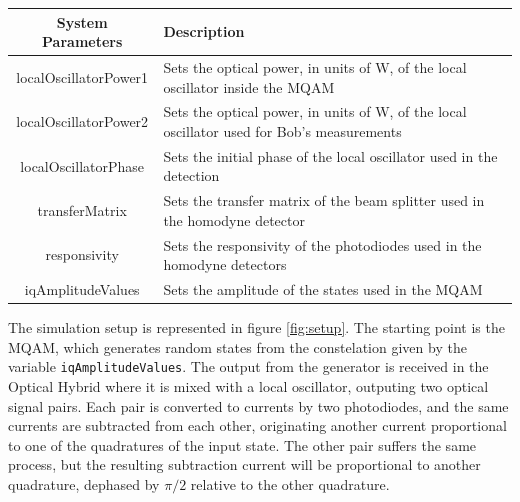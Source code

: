 \begin{table}[H]
\centering
\begin{tabulary}{1.0\textwidth}{|c|p{11cm}|}
\hline
\textbf{System Parameters} & \textbf{Description}\\
\hline
localOscillatorPower1	& Sets the optical power, in units of W, of the local oscillator inside the MQAM\\
\hline
localOscillatorPower2	& Sets the optical power, in units of W, of the local oscillator used for Bob's measurements\\
\hline
localOscillatorPhase	& Sets the initial phase of the local oscillator used in the detection\\
\hline
transferMatrix			& Sets the transfer matrix of the beam splitter used in the homodyne detector\\
\hline
responsivity			& Sets the responsivity of the photodiodes used in the homodyne detectors\\
\hline
iqAmplitudeValues		& Sets the amplitude of the states used in the MQAM\\
\hline
\end{tabulary}
\end{table}
%
\vspace{2em}
%
The simulation setup is represented in figure \ref{fig:setup}. The starting point is the MQAM, which generates random states from the constelation given by the variable \texttt{iqAmplitudeValues}. The output from the generator is received in the Optical Hybrid where it is mixed with a local oscillator, outputing two optical signal pairs. Each pair is converted to currents by two photodiodes, and the same currents are subtracted from each other, originating another current proportional to one of the quadratures of the input state. 
The other pair suffers the same process, but the resulting subtraction current will be proportional to another quadrature, dephased by $\pi/2$ relative to the other quadrature.\\
%


